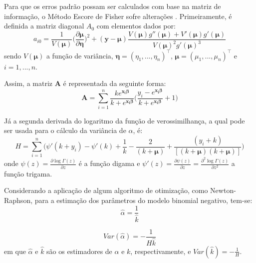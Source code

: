 \documentclass[12pt, a4paper, twoside]{report}
\numberwithin{equation}{section} %
\begin{document}
Para que os erros padrão possam ser calculados com base na matriz de informação, o Método Escore de Fisher sofre alterações \citep{hilbe2011}. Primeiramente, é definida a matriz diagonal $A_0$ com elementos dados por:
\begin{equation}\label{A0_bn}
a_{i0}=\frac{1}{V(\boldsymbol{\mu})} \biggl( \frac{\partial \boldsymbol{\mu}}{\partial \boldsymbol{\eta}} \biggl)^2 + (\boldsymbol{y}-\boldsymbol{\mu}) \frac{V(\boldsymbol{\mu})g''(\boldsymbol{\mu})+V'(\boldsymbol{\mu})g'(\boldsymbol{\mu})}{V(\boldsymbol{\mu})^2g'(\boldsymbol{\mu})^3}
\end{equation}
sendo $V(\boldsymbol{\mu})$ a função de variância, $\boldsymbol{\eta}=(\eta_1, ..., \eta_n)^\top$, $\boldsymbol{\mu} = (\mu_{1},...,\mu_{n})^\top$ e $i=1, ..., n$.

Assim, a matriz $\boldsymbol{A}$ é representada da seguinte forma:
\begin{equation}\label{A_bn}
\boldsymbol{A}=\sum \limits_{i=1}^{n} \frac{ke^{\boldsymbol{x_i\beta}}}{k+e^{\boldsymbol{x_i\beta}}} \biggl( \frac{y_i-e^{\boldsymbol{x_i\beta}}}{k+e^{\boldsymbol{x_i\beta}}}+1 \biggl)
\end{equation}

Já a segunda derivada do logaritmo da função de verossimilhança, a qual pode ser usada para o cálculo da variância de $\alpha$, é:
\begin{equation}\label{ll_derivada2_bn}
H= \sum \limits_{i=1}^{n} \biggl( \psi'(k+y_i) - \psi'(k) +\frac{1}{k}-\frac{2}{(k+\boldsymbol{\mu})}+\frac{(y_i+k)}{[(k+\boldsymbol{\mu})(k+\boldsymbol{\mu})]} \biggl)
\end{equation}
onde $ \psi (z)=\frac{\partial \log \Gamma(z)}{\partial z}$ é a função digama e $\psi'(z)=\frac{\partial \psi(z)}{\partial z}=\frac{\partial^2 \log \Gamma (z)}{\partial z^2}$ a função trigama.

Considerando a aplicação de algum algoritmo de otimização, como Newton-Raphson, para a estimação dos parâmetros do modelo binomial negativo, tem-se:
\begin{equation}\label{est_alpha}
\hat{\alpha}=\frac{1}{\hat{k}}
\end{equation}

\begin{equation}\label{var_est_alpha}
Var(\hat{\alpha})=-\frac{1}{H\hat{k}}
\end{equation}
em que $\hat{\alpha}$ e $\hat{k}$ são os estimadores de $\alpha$ e $k$, respectivamente, e $Var(\hat{k})=-\frac{1}{H}$.
\end{document}
